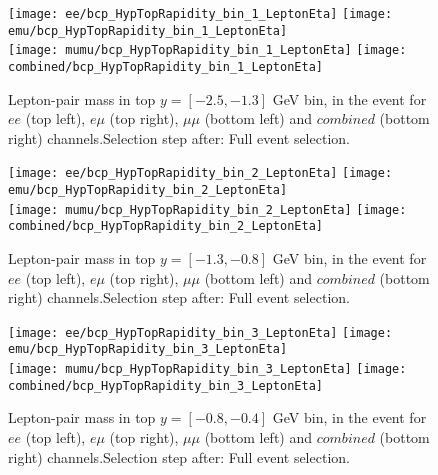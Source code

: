 \documentclass[12pt, a4paper, titlepage]{article}
\begin{document}
\begin{figure}
  \texttt{[image: ee/bcp\_HypTopRapidity\_bin\_1\_LeptonEta]}
  \texttt{[image: emu/bcp\_HypTopRapidity\_bin\_1\_LeptonEta]}\\
  \texttt{[image: mumu/bcp\_HypTopRapidity\_bin\_1\_LeptonEta]}
  \texttt{[image: combined/bcp\_HypTopRapidity\_bin\_1\_LeptonEta]}
\caption{Lepton-pair mass in top $y = [-2.5,-1.3]$ GeV bin, in the event for $ee$ (top left), $e\mu$ (top right), $\mu\mu$ (bottom left) and $combined$ (bottom right) channels.\newline Selection step after: Full event selection.}
\end{figure}

\clearpage
\newpage


\begin{figure}
  \texttt{[image: ee/bcp\_HypTopRapidity\_bin\_2\_LeptonEta]}
  \texttt{[image: emu/bcp\_HypTopRapidity\_bin\_2\_LeptonEta]}\\
  \texttt{[image: mumu/bcp\_HypTopRapidity\_bin\_2\_LeptonEta]}
  \texttt{[image: combined/bcp\_HypTopRapidity\_bin\_2\_LeptonEta]}
\caption{Lepton-pair mass in top $y = [-1.3,-0.8]$ GeV bin, in the event for $ee$ (top left), $e\mu$ (top right), $\mu\mu$ (bottom left) and $combined$ (bottom right) channels.\newline Selection step after: Full event selection.}
\end{figure}

\clearpage
\newpage


\begin{figure}
  \texttt{[image: ee/bcp\_HypTopRapidity\_bin\_3\_LeptonEta]}
  \texttt{[image: emu/bcp\_HypTopRapidity\_bin\_3\_LeptonEta]}\\
  \texttt{[image: mumu/bcp\_HypTopRapidity\_bin\_3\_LeptonEta]}
  \texttt{[image: combined/bcp\_HypTopRapidity\_bin\_3\_LeptonEta]}
\caption{Lepton-pair mass in top $y = [-0.8,-0.4]$ GeV bin, in the event for $ee$ (top left), $e\mu$ (top right), $\mu\mu$ (bottom left) and $combined$ (bottom right) channels.\newline Selection step after: Full event selection.}
\end{figure}

\clearpage
\newpage
\end{document}
